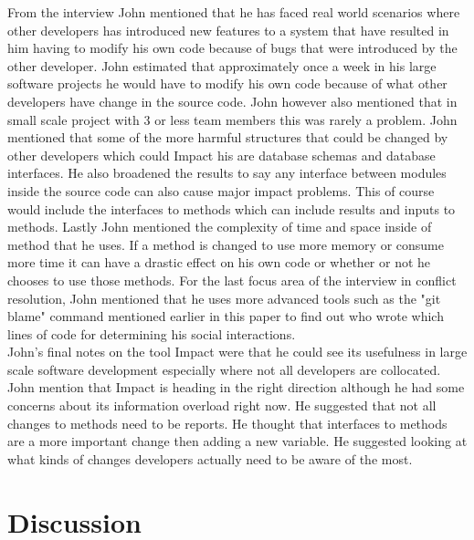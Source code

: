 \documentclass[conference]{IEEEtran}
\begin{document}
From the interview John mentioned that he has faced real world scenarios where other developers
has introduced new features to a system that have resulted in him having to modify his own code
because of bugs that were introduced by the other developer. John estimated that approximately
once a week in his large software projects he would have to modify his own code because of what
other developers have change in the source code. John however also mentioned that in small scale project with 3
or less team members this was rarely a problem. John mentioned that some of the more harmful 
structures that could be changed by other developers which could Impact his are database schemas
and database interfaces. He also broadened the results to say any interface between modules
inside the source code can also cause major impact problems.  This of course would include the interfaces
to methods which can include results and inputs to methods. Lastly John mentioned the complexity
of time and space inside of method that he uses. If a method is changed to use more memory or
consume more time it can have a drastic effect on his own code or whether or not he chooses to
use those methods. For the last focus area of the interview in conflict resolution, John mentioned 
that he uses more advanced tools such as the "git blame" command mentioned earlier in this paper
to find out who wrote which lines of code for determining his social interactions.\\

John's final notes on the tool Impact were that he could see its usefulness in large scale software
development especially where not all developers are collocated. John mention that Impact is
heading in the right direction although he had some concerns about its information overload
right now. He suggested that not all changes to methods need to be reports. He thought that
interfaces to methods are a more important change then adding a new variable. He suggested
looking at what kinds of changes developers actually need to be aware of the most.\\

 

\section{Discussion}
\end{document}
